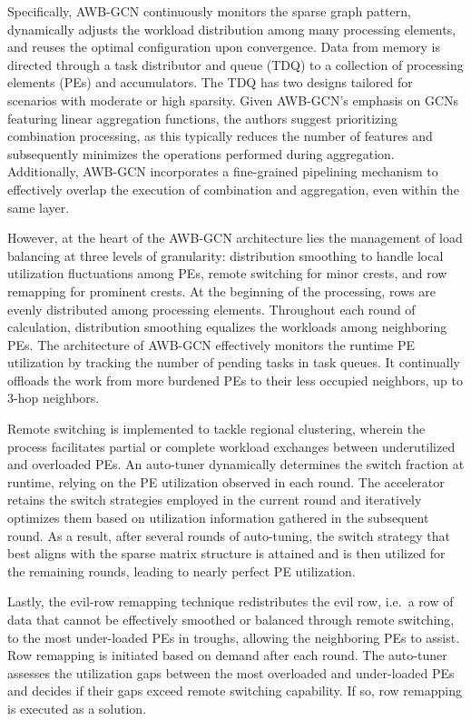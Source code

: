 Specifically, AWB-GCN continuously monitors the sparse graph pattern, dynamically adjusts the workload distribution among many processing elements, and reuses the optimal configuration upon convergence.
Data from memory is directed through a task distributor and queue (TDQ) to a collection of processing elements (PEs) and accumulators.
The TDQ has two designs tailored for scenarios with moderate or high sparsity.
Given AWB-GCN's emphasis on GCNs featuring linear aggregation functions, the authors suggest prioritizing combination processing, as this typically reduces the number of features and subsequently minimizes the operations performed during aggregation.
Additionally, AWB-GCN incorporates a fine-grained pipelining mechanism to effectively overlap the execution of combination and aggregation, even within the same layer.

However, at the heart of the AWB-GCN architecture lies the management of load balancing at three levels of granularity: distribution smoothing to handle local utilization fluctuations among PEs, remote switching for minor crests, and row remapping for prominent crests.
At the beginning of the processing, rows are evenly distributed among processing elements.
Throughout each round of calculation, distribution smoothing equalizes the workloads among neighboring PEs.
The architecture of AWB-GCN effectively monitors the runtime PE utilization by tracking the number of pending tasks in task queues.
It continually offloads the work from more burdened PEs to their less occupied neighbors, up to 3-hop neighbors.

Remote switching is implemented to tackle regional clustering, wherein the process facilitates partial or complete workload exchanges between underutilized and overloaded PEs.
An auto-tuner dynamically determines the switch fraction at runtime, relying on the PE utilization observed in each round.
The accelerator retains the switch strategies employed in the current round and iteratively optimizes them based on utilization information gathered in the subsequent round.
As a result, after several rounds of auto-tuning, the switch strategy that best aligns with the sparse matrix structure is attained and is then utilized for the remaining rounds, leading to nearly perfect PE utilization.

Lastly, the evil-row remapping technique redistributes the evil row, i.e.\ a row of data that cannot be effectively smoothed or balanced through remote switching, to the most under-loaded PEs in troughs, allowing the neighboring PEs to assist.
Row remapping is initiated based on demand after each round.
The auto-tuner assesses the utilization gaps between the most overloaded and under-loaded PEs and decides if their gaps exceed remote switching capability.
If so, row remapping is executed as a solution.

